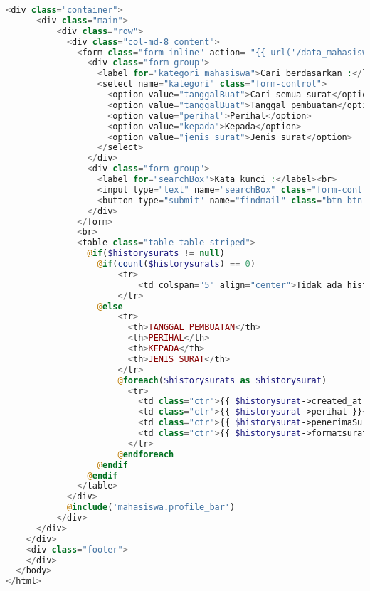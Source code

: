 \begin{lstlisting}[language=php, basicstyle=\tiny, caption=\textit{Home} mahasiswa]
    <div class="container">
      <div class="main">
          <div class="row">
            <div class="col-md-8 content">
              <form class="form-inline" action= "{{ url('/data_mahasiswa') }}" method="get">
                <div class="form-group">
                  <label for="kategori_mahasiswa">Cari berdasarkan :</label><br>
                  <select name="kategori" class="form-control">
                    <option value="tanggalBuat">Cari semua surat</option>
                    <option value="tanggalBuat">Tanggal pembuatan</option>
                    <option value="perihal">Perihal</option>
                    <option value="kepada">Kepada</option>
                    <option value="jenis_surat">Jenis surat</option>
                  </select>
                </div>
                <div class="form-group">
                  <label for="searchBox">Kata kunci :</label><br>
                  <input type="text" name="searchBox" class="form-control" size="80" />
                  <button type="submit" name="findmail" class="btn btn-primary">Cari surat</button>
                </div>
              </form>
              <br>
              <table class="table table-striped">
                @if($historysurats != null)
                  @if(count($historysurats) == 0)
                      <tr>
                          <td colspan="5" align="center">Tidak ada history surat....</td>
                      </tr>
                  @else
                      <tr>
                        <th>TANGGAL PEMBUATAN</th>
                        <th>PERIHAL</th>
                        <th>KEPADA</th>
                        <th>JENIS SURAT</th>
                      </tr>
                      @foreach($historysurats as $historysurat)
                        <tr>
                          <td class="ctr">{{ $historysurat->created_at }}</td>
                          <td class="ctr">{{ $historysurat->perihal }}</td>
                          <td class="ctr">{{ $historysurat->penerimaSurat }}</td>
                          <td class="ctr">{{ $historysurat->formatsurat->jenis_surat }}</td>
                        </tr>
                      @endforeach
                  @endif
                @endif
              </table>
            </div>
            @include('mahasiswa.profile_bar')
          </div>
      </div>
    </div>
    <div class="footer">
    </div>
  </body>
</html>

\end{lstlisting}


